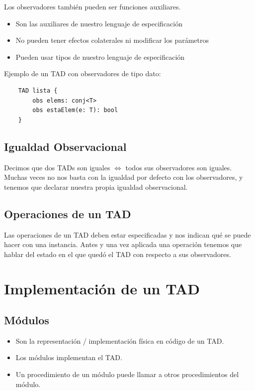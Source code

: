 \documentclass[10pt,a4paper]{article}
\begin{document}
Los observadores también pueden ser funciones auxiliares.
\begin{itemize}
    \item Son las auxiliares de nuestro lenguaje de especificación 
    \item No pueden tener efectos colaterales ni modificar los parámetros
    \item Pueden usar tipos de nuestro lenguaje de especificación 
\end{itemize} 
Ejemplo de un TAD con observadores de tipo dato:
\begin{lstlisting}
    TAD lista {
        obs elems: conj<T>
        obs estaElem(e: T): bool
    }
\end{lstlisting}

\subsection*{Igualdad Observacional}
Decimos que dos TADs son iguales \(\iff\) todos sus observadores son iguales.\\
Muchas veces no nos basta con la igualdad por defecto con los observadores, y tenemos que declarar nuestra propia igualdad observacional.

\subsection*{Operaciones de un TAD}
Las operaciones de un TAD deben estar especificadas y nos indican qué se puede hacer con una instancia.
Antes y una vez aplicada una operación tenemos que hablar del estado en el que quedó el TAD con respecto a sus observadores.
\section*{Implementación de un TAD}
\subsection*{Módulos}
\begin{itemize}
    \item Son la representación / implementación física en código de un TAD.
    \item Los módulos implementan el TAD.
    \item Un procedimiento de un módulo puede llamar a otros procedimientos del módulo.
\end{itemize}
\end{document}
